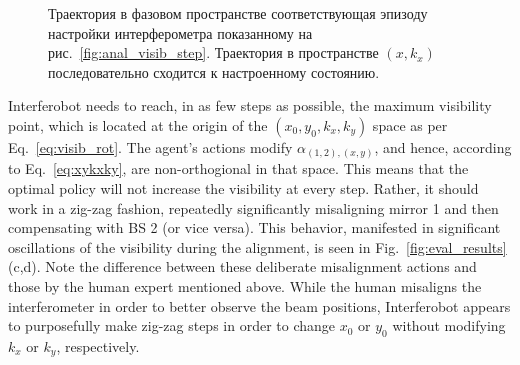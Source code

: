 \begin{figure}[ht]
\caption{Траектория в фазовом пространстве соответствующая эпизоду настройки интерферометра показанному на рис.~\ref{fig:anal_visib_step}. Траектория в пространстве $(x, k_x)$ последовательно сходится к настроенному состоянию.}
\label{fig:anal_kx}
\end{figure}

Interferobot needs to reach, in as few steps as possible, the maximum visibility point, which is located at the origin of the $(x_0,y_0,k_x,k_y)$ space as per Eq.~\eqref{eq:visib_rot}. The agent's actions modify $\alpha_{(1,2),(x,y)}$, and hence, according to Eq.~\eqref{eq:xykxky}, are non-orthogional in that space. This means that the optimal policy will not increase the visibility at every step. Rather, 
it should work in a zig-zag fashion, repeatedly significantly misaligning mirror 1 and then compensating with BS 2 (or vice versa). This behavior, manifested in significant oscillations of the visibility during the alignment, is seen in Fig.~\ref{fig:eval_results}(c,d). Note the difference between these deliberate misalignment actions and those by the human expert mentioned above. While the human misaligns the interferometer in order to better observe the beam positions, Interferobot appears to purposefully make zig-zag steps in order to change $x_0$ or $y_0$ without modifying $k_x$ or $k_y$, respectively.

